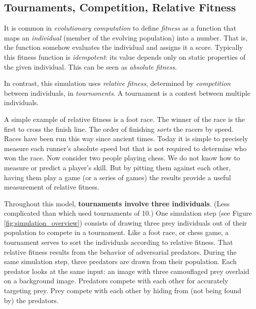 \documentclass[letterpaper]{article}
\newcommand{\jargon}[1]{\textit{#1}}
\begin{document}
\subsection{Tournaments, Competition, Relative Fitness}
\label{subsec:tournaments}
It is common in \jargon{evolutionary computation} to define \jargon{fitness} as a function that maps an \jargon{individual} (member of the evolving population) into a number. That is, the function somehow evaluates the individual and assigns it a score. Typically this fitness function is \jargon{idempotent}: its value depends only on static properties of the given individual. This can be seen as \jargon{absolute fitness}.
\par
In contrast, this simulation uses \jargon{relative fitness}, determined by \jargon{competition} between individuals, in \jargon{tournaments}. A tournament is a contest between multiple individuals. 
\par
A simple example of relative fitness is a foot race. The winner of the race is the first to cross the finish line. The order of finishing \jargon{sorts} the racers by speed. Races have been run this way since ancient times. Today it is simple to precisely measure each runner's absolute speed but that is not required to determine who won the race. Now consider two people playing chess. We do not know how to measure or predict a player's skill. But by pitting them against each other, having them play a game (or a series of games) the results provide a useful measurement of relative fitness. 
\par
Throughout this model, \textbf{tournaments involve three individuals}. (Less complicated than \citet{reynolds_iec_2011} which used tournaments of 10.) One simulation step (see Figure \ref{fig:simulation_overview}) consists of drawing three prey individuals out of their population to compete in a tournament. Like a foot race, or chess game, a tournament serves to sort the individuals according to relative fitness. That relative fitness results from the behavior of adversarial predators. During the same simulation step, three predators are drawn from their population. Each predator looks at the same input: an image with three camouflaged prey overlaid on a background image. Predators compete with each other for accurately targeting prey. Prey compete with each other by hiding from (not being found by) the predators.
\par

\end{document}
